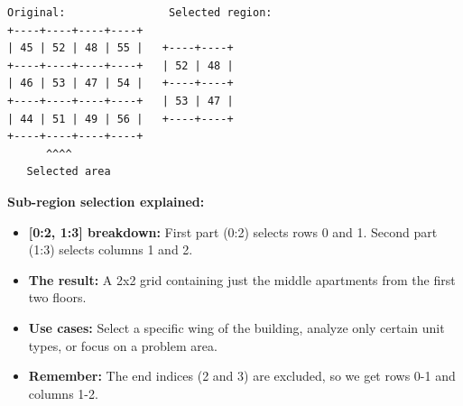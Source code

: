 \begin{tcolorbox}[
    title=Visual guide to array indexing,
    colframe=purple,
    colback = white,
    arc=2mm,
    breakable
]
\begin{lstlisting}[basicstyle=\ttfamily\footnotesize,breaklines=true,columns=fullflexible,keepspaces=true,xleftmargin=0pt]
Original:                Selected region:
+----+----+----+----+   
| 45 | 52 | 48 | 55 |   +----+----+
+----+----+----+----+   | 52 | 48 |
| 46 | 53 | 47 | 54 |   +----+----+
+----+----+----+----+   | 53 | 47 |
| 44 | 51 | 49 | 56 |   +----+----+
+----+----+----+----+
      ^^^^
   Selected area
\end{lstlisting}
\vspace{2em}
\textbf{Sub-region selection explained:}
\begin{itemize}
\item \textbf{[0:2, 1:3] breakdown:} First part (0:2) selects rows 0 and 1. Second part (1:3) selects columns 1 and 2.
\item \textbf{The result:} A 2x2 grid containing just the middle apartments from the first two floors.
\item \textbf{Use cases:} Select a specific wing of the building, analyze only certain unit types, or focus on a problem area.
\item \textbf{Remember:} The end indices (2 and 3) are excluded, so we get rows 0-1 and columns 1-2.
\end{itemize}
\end{tcolorbox}

